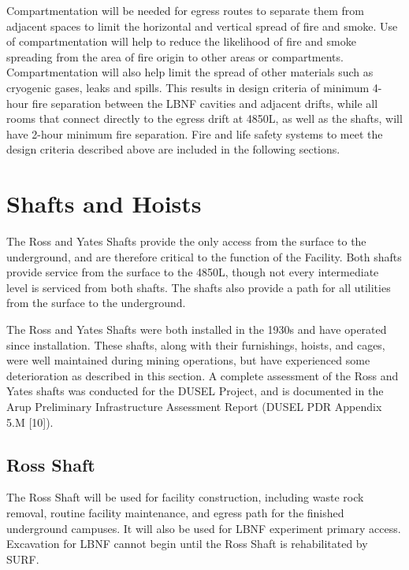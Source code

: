 Compartmentation will be needed for egress routes to separate them from adjacent spaces to limit the horizontal and vertical spread of fire and smoke. Use of compartmentation will help to reduce the likelihood of fire and smoke spreading from the area of fire origin to other areas or compartments. Compartmentation will also help limit the spread of other materials such as cryogenic gases, leaks and spills. This results in design criteria of minimum 4-hour fire separation between the LBNF cavities and adjacent drifts, while all rooms that connect directly to the egress drift at 4850L, as well as the shafts, will have 2-hour minimum fire separation.
Fire and life safety systems to meet the design criteria described above are included in the following sections.


\section{Shafts and Hoists}
\label{sec:fscf-und-shafts}

The Ross and Yates Shafts provide the only access from the surface to the underground, and are therefore critical to the function of the Facility. Both shafts provide service from the surface to the 4850L, though not every intermediate level is serviced from both shafts. The shafts also provide a path for all utilities from the surface to the underground. 

The Ross and Yates Shafts were both installed in the 1930s and have operated since installation. These shafts, along with their furnishings, hoists, and cages, were well maintained during mining operations, but have experienced some deterioration as described in this section. A complete assessment of the Ross and Yates shafts was conducted for the DUSEL Project, and is documented in the Arup Preliminary Infrastructure Assessment Report (DUSEL PDR Appendix 5.M [10]).



\subsection{Ross Shaft}
\label{sec:fscf-und-shafts-ross}

The Ross Shaft will be used for facility construction, including waste rock removal, routine facility maintenance, and egress path for the finished underground campuses. It will also be used for LBNF experiment primary access. Excavation for LBNF cannot begin until the Ross Shaft is rehabilitated by  SURF.

